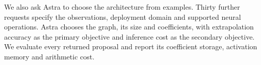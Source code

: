 We also ask Astra to choose the architecture from examples. Thirty further requests specify the observations, deployment domain and supported neural operations. Astra chooses the graph, its size and coefficients, with extrapolation accuracy as the primary objective and inference cost as the secondary objective. We evaluate every returned proposal and report its coefficient storage, activation memory and arithmetic cost.



